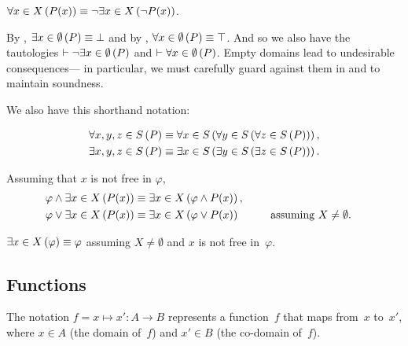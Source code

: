 \indexsym{}
\begin{definition}
  $\Forall{x\in X}{P(x)} \equiv \neg\Exists{x\in X}{\neg P(x)}$.
\end{definition}

\begin{remark}
  By , $\Exists{x\in\emptyset}P \equiv \false$
    and by , $\Forall{x\in\emptyset}P \equiv \true$.
  And so we also have the tautologies $\infer \neg\Exists{x\in\emptyset}P$
    and $\infer \Forall{x\in\emptyset}P$.
  Empty domains lead to undesirable consequences---%
    in particular,
      we must carefully guard against them in  and
         to maintain soundness.
\end{remark}

We also have this shorthand notation:

\begin{align}
  \Forall{x,y,z\in S}P \equiv
    \Forall{x\in S}{\Forall{y\in S}{\Forall{z\in S}P}}, \\
  \Exists{x,y,z\in S}P \equiv
    \Exists{x\in S}{\Exists{y\in S}{\Exists{z\in S}P}}.
\end{align}

\begin{definition}
  Assuming that $x$ is not free in $\varphi$,
  \begin{alignat*}{3}
    \varphi\land\Exists{x\in X}{P(x)}
      &\equiv \Exists{x\in X}{\varphi\land P(x)}, \\
    \varphi\lor\Exists{x\in X}{P(x)}
      &\equiv \Exists{x\in X}{\varphi\lor P(x)}
      \qquad&&\text{assuming $X\neq\emptyset$}.
  \end{alignat*}
\end{definition}

\begin{definition}
  $\Exists{x\in X}{\varphi} \equiv \varphi$ assuming $X\neq\emptyset$
    and $x$ is not free in~$\varphi$.
\end{definition}


\subsection{Functions}
\indexsym{}
\indexsym{}
The notation $f = x \mapsto x' : A\rightarrow B$ represents a function~$f$
  that maps from~$x$ to~$x'$,
    where $x\in A$ (the domain of~$f$) and $x'\in B$ (the co-domain of~$f$).

